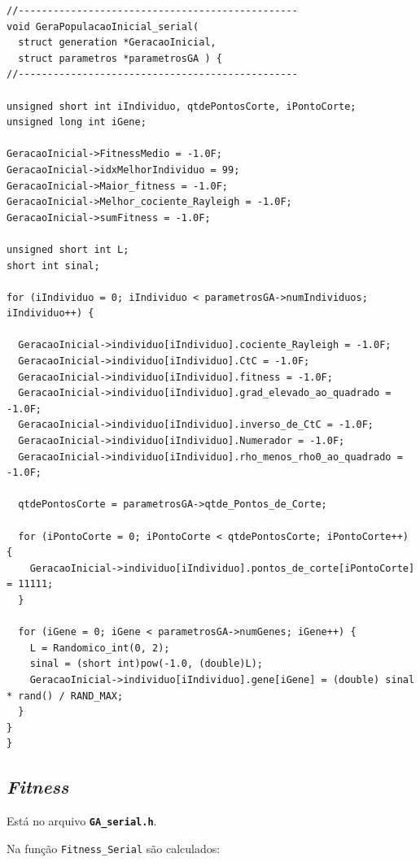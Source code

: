 \vspace{1 cm}
\begin{lstlisting}
//------------------------------------------------
void GeraPopulacaoInicial_serial(
  struct generation *GeracaoInicial,
  struct parametros *parametrosGA ) {
//------------------------------------------------

unsigned short int iIndividuo, qtdePontosCorte, iPontoCorte;
unsigned long int iGene;

GeracaoInicial->FitnessMedio = -1.0F;
GeracaoInicial->idxMelhorIndividuo = 99;
GeracaoInicial->Maior_fitness = -1.0F;
GeracaoInicial->Melhor_cociente_Rayleigh = -1.0F;
GeracaoInicial->sumFitness = -1.0F;	

unsigned short int L;
short int sinal;

for (iIndividuo = 0; iIndividuo < parametrosGA->numIndividuos; iIndividuo++) {		

  GeracaoInicial->individuo[iIndividuo].cociente_Rayleigh = -1.0F;
  GeracaoInicial->individuo[iIndividuo].CtC = -1.0F;
  GeracaoInicial->individuo[iIndividuo].fitness = -1.0F;
  GeracaoInicial->individuo[iIndividuo].grad_elevado_ao_quadrado = -1.0F;
  GeracaoInicial->individuo[iIndividuo].inverso_de_CtC = -1.0F;
  GeracaoInicial->individuo[iIndividuo].Numerador = -1.0F;
  GeracaoInicial->individuo[iIndividuo].rho_menos_rho0_ao_quadrado = -1.0F;

  qtdePontosCorte = parametrosGA->qtde_Pontos_de_Corte;

  for (iPontoCorte = 0; iPontoCorte < qtdePontosCorte; iPontoCorte++) {
    GeracaoInicial->individuo[iIndividuo].pontos_de_corte[iPontoCorte] = 11111;
  }

  for (iGene = 0; iGene < parametrosGA->numGenes; iGene++) {					
    L = Randomico_int(0, 2);
    sinal = (short int)pow(-1.0, (double)L);
    GeracaoInicial->individuo[iIndividuo].gene[iGene] = (double) sinal * rand() / RAND_MAX;
  }
}
}
\end{lstlisting}
\vspace{1 cm}

\subsection{\emph{Fitness}}

	Está no arquivo \textbf{\texttt{GA\_serial.h}}.
	
	Na função \texttt{Fitness\_Serial} são calculados:
	
